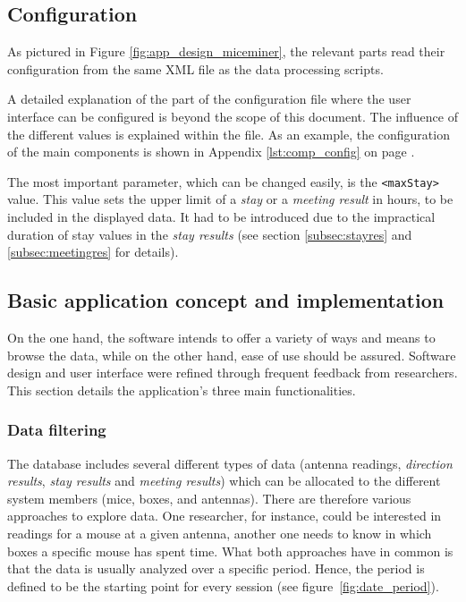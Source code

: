 \subsection{Configuration}
\label{subsec:miceminer_config}

As pictured in Figure \ref{fig:app_design_miceminer}, the relevant parts read their configuration from the same XML file as the data processing scripts. 

A detailed explanation of the part of the configuration file where the user interface can be configured is beyond the scope of this document. The influence of the different values is explained within the file. As an example, the configuration of the main components is shown in Appendix \ref{lst:comp_config} on page \pageref{lst:comp_config}.

The most important parameter, which can be changed easily, is the \lstinline|<maxStay>| value. This value sets the upper limit of a \textit{stay} or a \textit{meeting result} in hours, to be included in the displayed data. It had to be introduced due to the impractical duration of stay values in the \textit{stay results} (see section \ref{subsec:stayres} and \ref{subsec:meetingres} for details).

\subsection{Basic application concept and implementation}
\label{subsec:app_concept}

On the one hand, the software intends to offer a variety of ways and means to browse the data, while on the other hand, ease of use should be assured. Software design and user interface were refined through frequent feedback from researchers. This section details the application's three main functionalities.
   
\subsubsection{Data filtering}
\label{sububsec:datafilter}

The database includes several different types of data (antenna readings, \textit{direction results}, \textit{stay results} and \textit{meeting results}) which can be allocated to the different system members (mice, boxes, and antennas). There are therefore various approaches to explore data. One researcher, for instance, could be interested in readings for a mouse at a given antenna, another one needs to know in which boxes a specific mouse has spent time. What both approaches have in common is that the data is usually analyzed over a specific period. Hence, the period is defined to be the starting point for every session (see figure~\ref{fig:date_period}).


